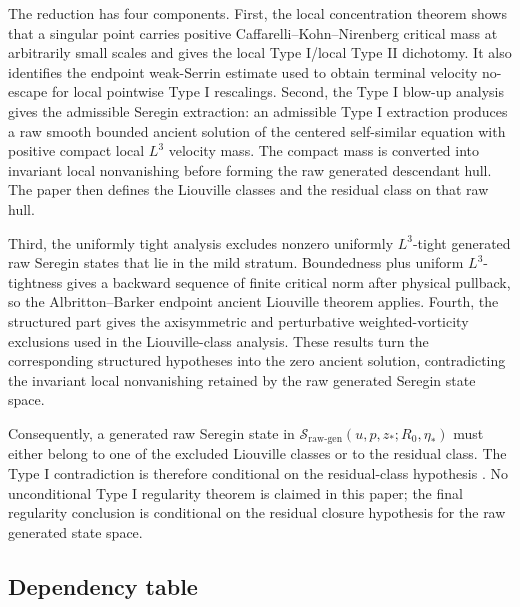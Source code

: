 \documentclass[11pt]{amsart}
\theoremstyle{plain}
\theoremstyle{definition}
\theoremstyle{remark}
\numberwithin{equation}{section}
\newcommand{\calS}{\mathcal S}
\begin{document}
The reduction has four components.  First, the local concentration theorem
shows that a singular point carries positive Caffarelli--Kohn--Nirenberg
critical mass at arbitrarily small scales and gives the local Type I/local Type
II dichotomy.  It also identifies the endpoint weak-Serrin estimate used to
obtain terminal velocity no-escape for local pointwise Type I rescalings.
Second, the Type I blow-up analysis gives the admissible Seregin extraction:
an admissible Type I extraction produces a raw smooth bounded ancient solution
of the centered self-similar equation with positive compact local \(L^3\)
velocity mass.  The compact mass is converted into invariant local
nonvanishing before forming the raw generated descendant hull.  The paper then
defines the Liouville classes and the residual class on that raw hull.

Third, the uniformly tight analysis excludes nonzero uniformly \(L^3\)-tight
generated raw Seregin states that lie in the mild stratum.  Boundedness plus uniform
\(L^3\)-tightness gives a backward sequence of finite critical norm after
physical pullback, so the Albritton--Barker endpoint ancient Liouville theorem
applies.  Fourth, the structured part gives the axisymmetric and
perturbative weighted-vorticity exclusions used in the Liouville-class analysis.
These results turn the corresponding structured hypotheses into the zero
ancient solution, contradicting the invariant local nonvanishing retained by
the raw generated Seregin state space.

Consequently, a generated raw Seregin state in
\(\calS_{\mathrm{raw\text{-}gen}}(u,p,z_*;R_0,\eta_*)\) must either belong to one of the excluded
Liouville classes or to the residual class.  The Type I contradiction is
therefore conditional on the residual-class hypothesis
.
No unconditional Type I regularity theorem is claimed in this paper; the final
regularity conclusion is conditional on the residual closure hypothesis for the
raw generated state space.

\subsection*{Dependency table}
\end{document}
